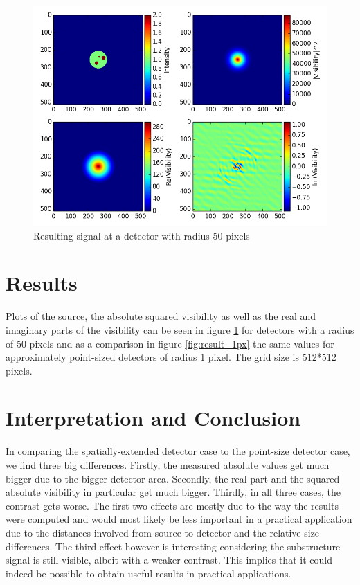 \documentclass{article}
\begin{document}
\begin{figure}[ht!]
	\centering
    \includegraphics[scale=0.5]{figure_results}
    \caption{Resulting signal at a detector with radius 50 pixels \label{fig:result_50px}
 }
\end{figure}
\section{Results}\label{results}

Plots of the source, the absolute squared visibility as well as the real and imaginary parts of the visibility can be seen in figure \ref{fig:result_50px} for detectors with a radius of 50 pixels and as a comparison in figure \ref{fig:result_1px} the same values for approximately point-sized detectors of radius 1 pixel. The grid size is 512*512 pixels.


\section{Interpretation and Conclusion}\label{conclusion}
In comparing the spatially-extended detector case to the point-size detector case, we find three big differences. Firstly, the measured absolute values get much bigger due to the bigger detector area. Secondly, the real part and the squared absolute visibility in particular get much bigger. Thirdly, in all three cases, the contrast gets worse. The first two effects are mostly due to the way the results were computed and would most likely be less important in a practical application due to the distances involved from source to detector and the relative size differences. The third effect however is interesting considering the substructure signal is still visible, albeit with a weaker contrast. This implies that it could indeed be possible to obtain useful results in practical applications. \\

\appendix
\label{app:a}




\end{document}
